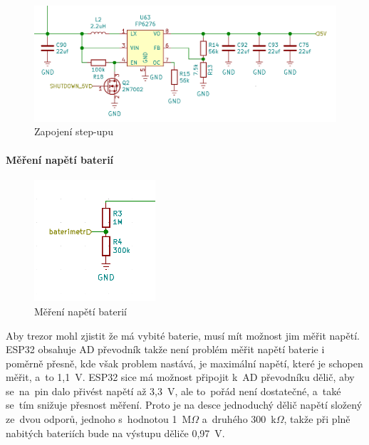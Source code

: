 \begin{figure}[htbp]
    \centering
    \includegraphics[width=400pt]{kapitoly/obrazky/E4/napajeni/step-up.png}
    \caption{Zapojení step-upu}
    \label{fig:E4-step-up}
\end{figure}

\newpage

\paragraph*{Měření napětí baterií}

\begin{figure}
    \centering
    \includegraphics[width=0.4\textwidth]{kapitoly/obrazky/E4/napajeni/delic_baterimetru.png}
    \caption{Měření napětí baterií\label{fig:frog1}}
\end{figure}

Aby trezor mohl zjistit že má vybité baterie, musí mít možnost jim měřit napětí. ESP32 obsahuje AD převodník takže není problém měřit napětí baterie 
i poměrně přesně, kde však problem nastává, je maximální napětí, které je schopen měřit, a~to 1,1~V. ESP32 sice má možnost připojit k~AD převodníku dělič,
aby se~na~pin dalo přivést napětí až 3,3~V, ale to~pořád není dostatečné, a~také se~tím snižuje přesnost měření. Proto je na desce jednoduchý dělič napětí
složený ze~dvou odporů, jednoho s~hodnotou 1~M$\Omega$ a~druhého 300~k$\Omega$, takže při plně nabitých bateriích bude na výstupu děliče 0,97~V. %

\newpage